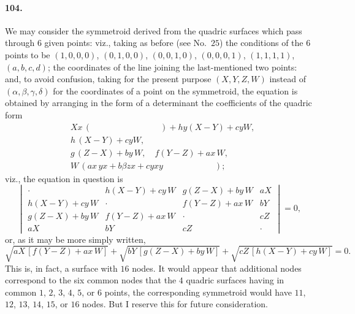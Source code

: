 \documentclass[11pt,a4paper]{article}
\begin{document}
\medskip

\paragraph{104.}
We may consider the symmetroid derived from the quadric surfaces which pass through
$6$ given points: viz., taking as before (see No.\ $25$) the conditions of the $6$
points to be $(1, 0, 0, 0)$, $(0, 1, 0, 0)$, $(0, 0, 1, 0)$, $(0, 0, 0, 1)$,
$(1, 1, 1, 1)$, $(a, b, c, d)$; the coordinates of the line joining the last-mentioned
two points: and, to avoid confusion, taking for the present purpose $(X, Y, Z, W)$
instead of $(\alpha, \beta, \gamma, \delta)$ for the coordinates of a point on the
symmetroid, the equation is obtained by arranging in the form of a determinant the
coefficients of the quadric form
\begin{align*}
& X x\,(\hspace{8em}) + h y(X - Y) + cy W,\\
& h\,(X - Y) + cy W,\\
& g\,(Z - X) + b y\,W,\quad f(Y - Z) + a x\,W,\\
& W\,(a x\,yx + b\beta z x + c y x y\hspace{6em});
\end{align*}
viz., the equation in question is
\[
\begin{vmatrix}
\cdot & h(X-Y)+cy\,W & g(Z-X)+b y\,W & a X\\
h(X-Y)+cy\,W & \cdot & f(Y-Z)+a x\,W & b Y\\
g(Z-X)+b y\,W & f(Y-Z)+a x\,W & \cdot & c Z\\
a X & b Y & c Z & \cdot
\end{vmatrix} = 0,
\]
or, as it may be more simply written,
\[
\sqrt{a X\,[f(Y - Z) + a x\,W]} + \sqrt{b Y\,[g(Z - X) + b y\,W]}
+ \sqrt{c Z\,[h(X - Y) + c y\,W]} = 0.
\]
This is, in fact, a surface with $16$ nodes. It would appear that additional nodes
correspond to the six common nodes that the $4$ quadric surfaces having in common
$1$, $2$, $3$, $4$, $5$, or $6$ points, the corresponding symmetroid would have $11$,
$12$, $13$, $14$, $15$, or $16$ nodes. But I reserve this for future consideration.

\bigskip
\end{document}
